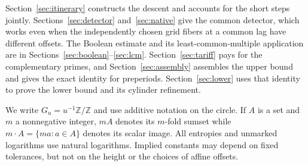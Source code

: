 Section~\ref{sec:itinerary} constructs the descent and accounts for the
short steps jointly. Sections~\ref{sec:detector} and~\ref{sec:native}
give the common detector, which works even when the independently chosen
grid fibers at a common lag have different offsets. The Boolean estimate
and its least-common-multiple application are in
Sections~\ref{sec:boolean}--\ref{sec:lcm}. Section~\ref{sec:tariff}
pays for the complementary primes, and Section~\ref{sec:assembly}
assembles the upper bound and gives the exact identity for preperiods.
Section~\ref{sec:lower} uses that identity to prove the lower bound and its cylinder refinement.

We write \(G_u=u^{-1}\mathbb Z/\mathbb Z\) and use additive notation on
the circle. If \(A\) is a set and \(m\) a nonnegative integer, \(mA\)
denotes its \(m\)-fold sumset while \(m\cdot A=\{ma:a\in A\}\)
denotes its scalar image. All entropies and unmarked logarithms use
natural logarithms. Implied constants may depend on fixed tolerances,
but not on the height or the choices of affine offsets.
